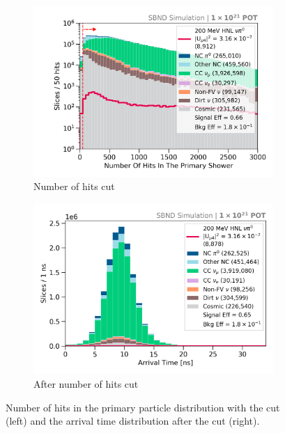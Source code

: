 \begin{figure}[ht!]
        \begin{subfigure}[b]{0.495\textwidth}   
            \centering 
            \includegraphics[width=\textwidth]{nHits}
            \caption{Number of hits cut}%
            \label{fig:Nhits_cut}
        \end{subfigure}
        \hfill
        \begin{subfigure}[b]{0.495\textwidth}   
            \centering 
            \includegraphics[width=\textwidth]{beam_bucket_postNhits}
            \caption{After number of hits cut}%
            \label{fig:bb_postNhits}
        \end{subfigure}
	\caption[Number of Hits Cut]{
		Number of hits in the primary particle distribution with the cut (left) and the arrival time distribution after the cut (right). 
	}
        \label{fig:quality_hits_cut}
\end{figure}

